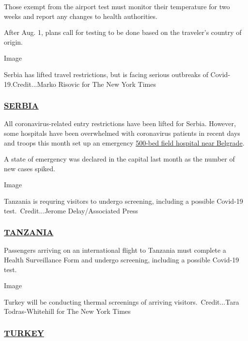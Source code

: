 Those exempt from the airport test must monitor their temperature for
two weeks and report any changes to health authorities.

After Aug. 1, plans call for testing to be done based on the traveler's
country of origin.

Image

Serbia has lifted travel restrictions, but is facing serious outbreaks
of Covid-19.Credit...Marko Risovic for The New York Times

\hypertarget{serbia}{%
\subsubsection{\texorpdfstring{\href{https://rs.usembassy.gov/health-and-travel-alert-3/}{SERBIA}}{SERBIA}}\label{serbia}}

All coronavirus-related entry restrictions have been lifted for Serbia.
However, some hospitals have been overwhelmed with coronavirus patients
in recent days and troops this month set up an emergency
\href{https://www.republicworld.com/world-news/europe/serbia-military-sets-up-field-hospital-for-virus.html}{500-bed
field hospital near Belgrade}.

A state of emergency was declared in the capital last month as the
number of new cases spiked.

Image

Tanzania is requring visitors to undergo screening, including a possible
Covid-19 test.~Credit...Jerome Delay/Associated Press

\hypertarget{tanzania}{%
\subsubsection{\texorpdfstring{\href{https://tanzaniaembassy-us.org}{TANZANIA}}{TANZANIA}}\label{tanzania}}

Passengers arriving on an international flight to Tanzania must complete
a Health Surveillance Form and undergo screening, including a possible
Covid-19 test.

Image

Turkey will be conducting thermal screenings of arriving
visitors.~Credit...Tara Todras-Whitehill for The New York Times

\hypertarget{turkey}{%
\subsubsection{\texorpdfstring{\href{https://tr.usembassy.gov/covid-19-information-2/}{TURKEY}}{TURKEY}}\label{turkey}}

